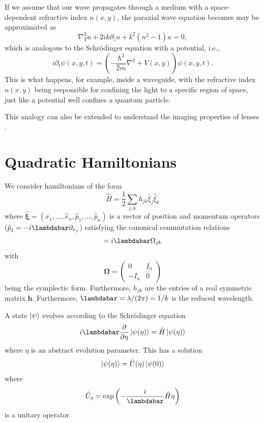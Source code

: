 \documentclass[a4paper,10pt]{report}
\begin{document}
If we assume that our wave propagates through a medium with a space-dependent refractive index $n(x,y)$, the paraxial wave equation becomes may be approximated as
\begin{equation}
    \nabla^2_T u + 2ik \partial_z u + k^2(n^2 - 1) u = 0,
\end{equation}
which is analogous to the Schrödinger equation with a potential, i.e.,
\begin{equation}
    i \partial_t \psi(x, y, t) = \left( -\frac{\hbar^2}{2m} \nabla^2 + V(x,y) \right) \psi(x, y, t).
\end{equation}
This is what happens, for example, inside a waveguide, with the refractive index $n(x,y)$ being responsible for confining the light to a specific region of space, just like a potential well confines a quantum particle.

This analogy can also be extended to understand the imaging properties of lenses \cite{stoler1981operator}.

\section{Quadratic Hamiltonians}

We consider hamiltonians of the form
\begin{equation}
\hat{H} = \frac{1}{2} \sum_{j,k} h_{jk} \hat{\xi}_j \hat{\xi}_k
\end{equation}
where $\boldsymbol{\hat{\xi}} = (\hat{x}_1, \ldots, \hat{x}_n, \hat{p}_1, \ldots, \hat{p}_n)$ is a vector of position and momentum operators ($\hat{p}_j = -i \lambdabar \partial_{x_j}$) satisfying the canonical commutation relations
\begin{equation}
[\hat{\xi}_j, \hat{\xi}_k] = i \lambdabar \Omega_{jk}
\end{equation}
with
\begin{equation}
\boldsymbol{\Omega} = \begin{pmatrix}0 & I_n \\ -I_n & 0 \end{pmatrix}
\end{equation}
being the symplectic form. Furthermore, $h_{jk}$ are the entries of a real symmetric matrix $\mathbf{h}$. Furthermore, $\lambdabar = \lambda/(2\pi) = 1/k$ is the reduced wavelength.

A state $\ket{\psi}$ evolves according to the Schrödinger equation
\begin{equation}
    \label{eq:schrodinger_like_equation}
i \lambdabar \frac{\partial}{\partial \eta} \ket{\psi(\eta)} = \hat{H} \ket{\psi(\eta)}
\end{equation}
where $\eta$ is an abstract evolution parameter. This has a solution
\begin{equation}
    \label{eq:schrodinger_like_solution}
    \ket{\psi(\eta)} = \hat{U}(\eta) \ket{\psi(0)}
\end{equation}
where
\begin{equation}\hat{U}_\eta = \exp\left(-\frac{i}{\lambdabar} \hat{H} \eta\right)\end{equation}
is a unitary operator.
\end{document}
